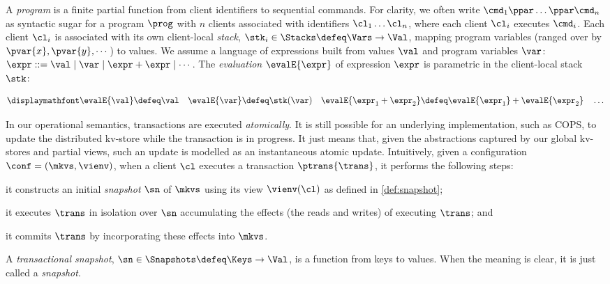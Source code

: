 A {\em program} is a finite partial function from client identifiers to sequential
commands.
For clarity, we often write \( \cmd_{1}\ppar \dots \ppar \cmd_{n}\) as syntactic sugar 
for a program \( \prog \) with $n$ clients associated with identifiers
$\cl_1 \dots \cl_n$, where each client $\cl_i$ executes
$\cmd_i$. 
Each client $\cl_i$ is associated with its own client-local  \emph{stack}, 
$\stk_i \in \Stacks \defeq \Vars \to \Val$,  mapping program variables
(ranged over by $\pvar{x}, \pvar{y}, \cdots$)
to values. 
We assume a language of expressions built from values \( \val \)
and program variables \( \var \):
$\expr ::= \val \mid \var \mid \expr + \expr \mid \cdots$.
The \emph{evaluation} $\evalE{\expr}$ of expression $\expr$ is parametric in
the client-local stack \( \stk \):%

\vspace{-5pt}
{%
\[
\displaymathfont
\begin{gathered}
\evalE{\val} \defeq
\val
\quad
\evalE{\var} \defeq
\stk(\var)
\quad
\evalE{\expr_{1} + \expr_{2}} \defeq
\evalE{\expr_{1}} + \evalE{\expr_{2}}
\quad
\dots
\end{gathered}%
\]
}%

In our operational semantics, transactions are executed
\emph{atomically}. It is still possible for an underlying
implementation, such as COPS, to update the distributed kv-store while
the transaction is in progress. It just means that, given the
abstractions captured by our global kv-stores and partial views, 
such an update is modelled as  an instantaneous  atomic
update.
Intuitively, given a configuration $\conf = (\mkvs, \vienv)$, 
when a client $\cl$ executes a transaction $\ptrans{\trans}$, 
it performs the following steps: 
\begin{enumerate*}
	\item it constructs an initial \emph{snapshot} $\sn$ of $\mkvs$ using its view $\vienv(\cl)$ as defined in \cref{def:snapshot};  
	\item it executes $\trans$ in isolation over $\sn$
        accumulating the effects (the reads and writes) of executing $\trans$; and
	\item it commits $\trans$ by incorporating these effects into $\mkvs$.
\end{enumerate*}

\begin{definition}
\label{def:heaps}
A \emph{transactional snapshot}, \( \sn \in \Snapshots \defeq \Keys \to
\Val\),  is a function from keys to values. When the meaning is clear,
it is just called a {\em snapshot}. 
\end{definition}


